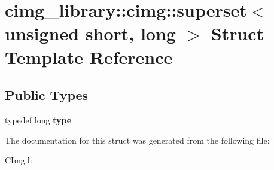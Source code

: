 \hypertarget{structcimg__library_1_1cimg_1_1superset_3_01unsigned_01short_00_01long_01_4}{\section{cimg\-\_\-library\-:\-:cimg\-:\-:superset$<$ unsigned short, long $>$ Struct Template Reference}
\label{structcimg__library_1_1cimg_1_1superset_3_01unsigned_01short_00_01long_01_4}
}
\subsection*{Public Types}
\begin{DoxyCompactItemize}
\item 
\hypertarget{structcimg__library_1_1cimg_1_1superset_3_01unsigned_01short_00_01long_01_4_a5831feab5f0377ffa111042b39c368df}{typedef long {\bfseries type}}\label{structcimg__library_1_1cimg_1_1superset_3_01unsigned_01short_00_01long_01_4_a5831feab5f0377ffa111042b39c368df}

\end{DoxyCompactItemize}


The documentation for this struct was generated from the following file\-:\begin{DoxyCompactItemize}
\item 
C\-Img.\-h\end{DoxyCompactItemize}
